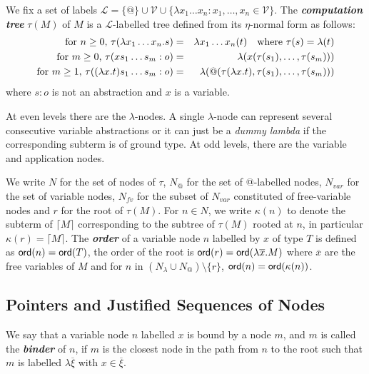 \documentclass{llncs}
\newcommand\defname[1]{{\bf\em #1}\index{#1}}
\newcommand\aux[1]{\lceil #1\rceil}
\newcommand\ord[1]{{\sf ord}(#1)}
\newcommand\union{\cup}
\begin{document}
\begin{definition}
We fix a set of labels
$ \mathcal{L} = \{ @ \} \union \mathcal{V} \union \{ \lambda x_1 \ldots x_n : x_1 ,\ldots, x_n \in \mathcal{V} \}$.
The \defname{computation tree} $\tau(M)$ of $M$ is
a $\mathcal{L}$-labelled tree defined from its $\eta$-normal form as follows:
\begin{eqnarray*}
  \mbox{for $n\geq0$, } \tau(\lambda x_1 \ldots x_n . s) &=& \lambda x_1 \ldots x_n(t) \mbox{\quad where $\tau(s) = \lambda(t)$}\\
  \mbox{for $m\geq0$, } \tau( x s_1 \ldots s_m : o) &=&  \lambda (x(\tau(s_1),\ldots,\tau(s_m)))\\
  \mbox{for $m \geq 1$, } \tau((\lambda x.t) s_1 \ldots s_m :o) &=& \lambda (@(\tau(\lambda x.t),\tau(s_1),\ldots,\tau(s_m)))
\end{eqnarray*}
where $s:o$ is not an abstraction and $x$ is a variable.
\end{definition}

At even levels there are the $\lambda$-nodes. A single $\lambda$-node can represent several consecutive variable abstractions or it can just be
a \textsl{dummy lambda} if the corresponding subterm is of ground type.
At odd levels, there are the variable and application nodes.

We write $N$ for the set of nodes of $\tau$, $N_@$ for the set of @-labelled nodes,
$N_{var}$ for the set of variable nodes,
$N_{fv}$ for the subset of $N_{var}$ constituted of free-variable nodes and $r$ for the root of $\tau(M)$.
For $n \in N$, we write $\kappa(n)$ to denote the subterm of $\aux{M}$
corresponding to the subtree of $\tau(M)$ rooted at $n$, in particular $\kappa(r) = \aux{M}$.
The \defname{order} of a variable node $n$ labelled by $x$ of type $T$ 
is defined as $\ord{n} = \ord{T}$, the order of the root is $\ord{r} = \ord{\lambda \overline{x} . M}$ where $\overline{x}$ are the free variables of $M$ and for $n$ in $(N_\lambda \union N_@) \setminus \{ r \}$, $\ord{n} = \ord{\kappa(n)}$.


\subsection{Pointers and Justified Sequences of Nodes}

We say that a variable node $n$ labelled $x$ is bound by a node $m$, and $m$ is called the
\defname{binder} of $n$, if $m$ is the closest node in the path from $n$ to
the root such that $m$ is labelled $\lambda \overline{\xi}$ with $x\in \overline{\xi}$.
\end{document}
